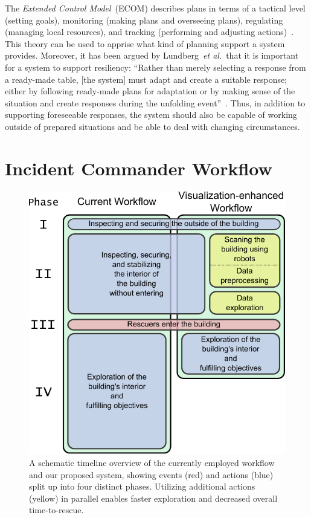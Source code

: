 \documentclass{egpubl}
\def\etal{\textit{et al.}}
\begin{document}
The \emph{Extended Control Model}~(ECOM) describes plans in terms of a tactical level (setting goals), monitoring (making plans and overseeing plans), regulating (managing local resources), and tracking (performing and adjusting actions)~\cite{hollnagel2005joint}. This theory can be used to apprise what kind of planning support a system provides. Moreover, it has been argued by Lundberg~\etal\ that it is important for a system to support resiliency: ``Rather than merely selecting a response from a ready-made table, [the system] must adapt and create a suitable response; either by following ready-made plans for adaptation or by making sense of the situation and create responses during the unfolding event''~\cite{Lundberg2012}. Thus, in addition to supporting foreseeable responses, the system should also be capable of working outside of prepared situations and be able to deal with changing circumstances.


\section{Incident Commander Workflow} \label{sec:workflow}

\begin{figure}
	\newcommand{\abWorkflowImageHeight}{\columnwidth}
	\centering
	\includegraphics[height=\abWorkflowImageHeight]{figures/workflow.pdf}
	\caption{A schematic timeline overview of the currently employed workflow and our proposed system, showing events (red) and actions (blue) split up into four distinct phases. Utilizing additional actions (yellow) in parallel enables faster exploration and decreased overall time-to-rescue.}
	\label{fig:workflow:workflow}
\end{figure}
\end{document}
